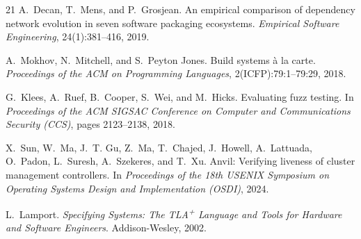 \documentclass[10pt,conference]{IEEEtran}
\theoremstyle{definition}
\begin{document}
\begin{thebibliography}{21}
A.~Decan, T.~Mens, and P.~Grosjean.
An empirical comparison of dependency network evolution in seven
software packaging ecosystems.
\emph{Empirical Software Engineering}, 24(1):381--416, 2019.

A.~Mokhov, N.~Mitchell, and S.~Peyton Jones.
Build systems \`a la carte.
\emph{Proceedings of the ACM on Programming Languages},
2(ICFP):79:1--79:29, 2018.

G.~Klees, A.~Ruef, B.~Cooper, S.~Wei, and M.~Hicks.
Evaluating fuzz testing.
In \emph{Proceedings of the ACM SIGSAC Conference on Computer and
Communications Security (CCS)}, pages 2123--2138, 2018.

X.~Sun, W.~Ma, J.~T. Gu, Z.~Ma, T.~Chajed, J.~Howell, A.~Lattuada,
O.~Padon, L.~Suresh, A.~Szekeres, and T.~Xu.
Anvil: Verifying liveness of cluster management controllers.
In \emph{Proceedings of the 18th USENIX Symposium on Operating Systems
Design and Implementation (OSDI)}, 2024.

L.~Lamport.
\emph{Specifying Systems: The TLA\textsuperscript{+} Language and
Tools for Hardware and Software Engineers}.
Addison-Wesley, 2002.


\end{thebibliography}
\end{document}
